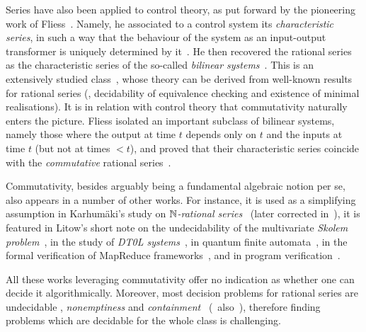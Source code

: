 Series have also been applied to control theory,
as put forward by the pioneering work of Fliess~\cite{Fliess:1981}.
%
Namely, he associated to a control system its \emph{characteristic series},
in such a way that the behaviour of the system as an input-output transformer
is uniquely determined by it~\cite[Lemme II.1]{Fliess:1981}.
%
He then recovered the rational series
as the characteristic series of the so-called \emph{bilinear systems}~\cite{Fliess:MST:1976}.
%
This is an extensively studied class~\cite{DAlessandroIsidoriRuberti:SIAMJoC:1974},
whose theory can be derived from well-known results for rational series
(\eg, decidability of equivalence checking and existence of minimal realisations).
%
It is in relation with control theory
that commutativity naturally enters the picture.
%
Fliess isolated an important subclass of bilinear systems,
namely those 
where the output at time $t$ depends only on $t$ and the inputs at time $t$ (but not at times $< t$),
and proved that their characteristic series coincide with the \emph{commutative} rational series~\cite[Proposition 3.6]{Fliess:MST:1976}.

Commutativity, besides arguably being a fundamental algebraic notion per se,
also appears in a number of other works.
%
For instance, it is used as a simplifying assumption
in Karhumäki's study on \emph{$\mathbb N$-rational series}~\cite{Karhumaki:TCS:1977}
(later corrected in~\cite{Lopez:STACS:2025}),
it is featured in Litow's short note on the undecidability of the multivariate \emph{Skolem problem}~\cite{Litow:IPL:2003},
in the study of \emph{DT0L systems}~\cite{Karhumaki:TCS:1979},
in quantum finite automata~\cite{HuangCao:CTISC:2021},
in the formal verification of MapReduce frameworks~\cite{ChenSongWu:CAV:2016},
and in program verification~\cite{Farzan:LICS:2023}.
%

All these works leveraging commutativity offer no indication
as whether one can decide it algorithmically. %
%
Moreover, most decision problems for rational series are undecidable
\eg, \emph{nonemptiness} and \emph{containment}~\cite[Theorem 21]{NasuHonda:IC:1969}\-
(\cf~also~\cite[Theorem 6.17]{Paz:1971}),
therefore finding problems which are decidable for the whole class is challenging.

